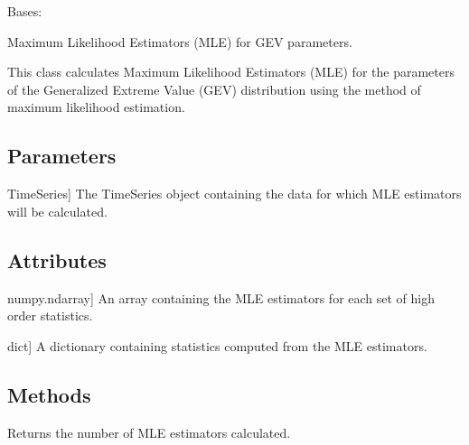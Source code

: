 \documentclass[a4paper,11pt,openany,english]{sphinxmanual}
\begin{document}
\begin{fulllineitems}
\label{\detokenize{api_topt:xtremes.topt.ML_estimators}}
\pysigstartsignatures
{}
\pysigstopsignatures
\sphinxAtStartPar
Bases: 

\sphinxAtStartPar
Maximum Likelihood Estimators (MLE) for GEV parameters.

\sphinxAtStartPar
This class calculates Maximum Likelihood Estimators (MLE) for the parameters of the Generalized Extreme Value (GEV) distribution using the method of maximum likelihood estimation.


\subsection{Parameters}
\label{\detokenize{api_topt:id47}}\begin{description}
\sphinxlineitem{TimeSeries}{[}TimeSeries{]}
\sphinxAtStartPar
The TimeSeries object containing the data for which MLE estimators will be calculated.

\end{description}


\subsection{Attributes}
\label{\detokenize{api_topt:id48}}\begin{description}
\sphinxlineitem{values}{[}numpy.ndarray{]}
\sphinxAtStartPar
An array containing the MLE estimators for each set of high order statistics.

\sphinxlineitem{statistics}{[}dict{]}
\sphinxAtStartPar
A dictionary containing statistics computed from the MLE estimators.

\end{description}


\subsection{Methods}
\label{\detokenize{api_topt:id49}}\begin{description}
\sphinxAtStartPar
Returns the number of MLE estimators calculated.


\end{description}
\end{fulllineitems}
\end{document}
